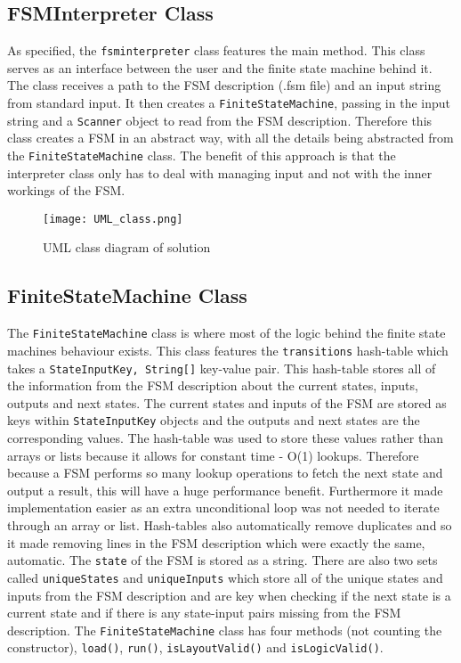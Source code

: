 \documentclass{article}
\begin{document}
\subsection{FSMInterpreter Class}
As specified, the \verb+fsminterpreter+ class features the main method. This class serves as an interface between the user and the finite state machine behind it. The class receives a path to the FSM description (.fsm file) and an input string from standard input. It then creates a \verb+FiniteStateMachine+, passing in the input string and a \verb+Scanner+ object to read from the FSM description. Therefore this class creates a FSM in an abstract way, with all the details being abstracted from the \verb+FiniteStateMachine+ class. The benefit of this approach is that the interpreter class only has to deal with managing input and not with the inner workings of the FSM.
\begin{figure}[h]
\centering
\texttt{[image: UML\_class.png]}
\caption{UML class diagram of solution}
\label{fig:uml}
\end{figure}
\subsection{FiniteStateMachine Class}
The \verb+FiniteStateMachine+ class is where most of the logic behind the finite state machines behaviour exists. This class features the \verb+transitions+ hash-table which takes a \verb+StateInputKey, String[]+ key-value pair. This hash-table stores all of the information from the FSM description about the current states, inputs, outputs and next states. The current states and inputs of the FSM are stored as keys within \verb+StateInputKey+ objects and the outputs and next states are the corresponding values. The hash-table was used to store these values rather than arrays or lists because it allows for constant time - O(1) lookups. Therefore because a FSM performs so many lookup operations to fetch the next state and output a result, this will have a huge performance benefit. Furthermore it made implementation easier as an extra unconditional loop was not needed to iterate through an array or list. Hash-tables also automatically remove duplicates and so it made removing lines in the FSM description which were exactly the same, automatic. The \verb+state+ of the FSM is stored as a string. There are also two sets called \verb+uniqueStates+ and \verb+uniqueInputs+ which store all of the unique states and inputs from the FSM description and are key when checking if the next state is a current state and if there is any state-input pairs missing from the FSM description. The \verb+FiniteStateMachine+ class has four methods (not counting the constructor), \verb+load()+, \verb+run()+, \verb+isLayoutValid()+ and \verb+isLogicValid()+.
\end{document}
